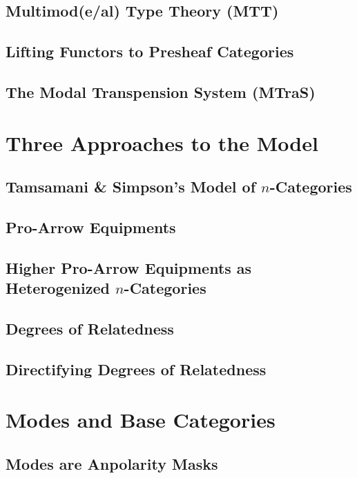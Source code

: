 \documentclass{lmcs} %
\theoremstyle{plain}\newtheorem{satz}[thm]{Satz} %
\theoremstyle{plain}
\theoremstyle{definition}
\begin{document}
\subsection{Multimod(e/al) Type Theory (MTT)}

\subsection{Lifting Functors to Presheaf Categories}

\subsection{The Modal Transpension System (MTraS)}

\section{Three Approaches to the Model}

\subsection{Tamsamani \& Simpson's Model of $n$-Categories}

\subsection{Pro-Arrow Equipments}

\subsection{Higher Pro-Arrow Equipments as Heterogenized $n$-Categories}

\subsection{Degrees of Relatedness}

\subsection{Directifying Degrees of Relatedness}

\section{Modes and Base Categories}

\subsection{Modes are Anpolarity Masks}
\end{document}
